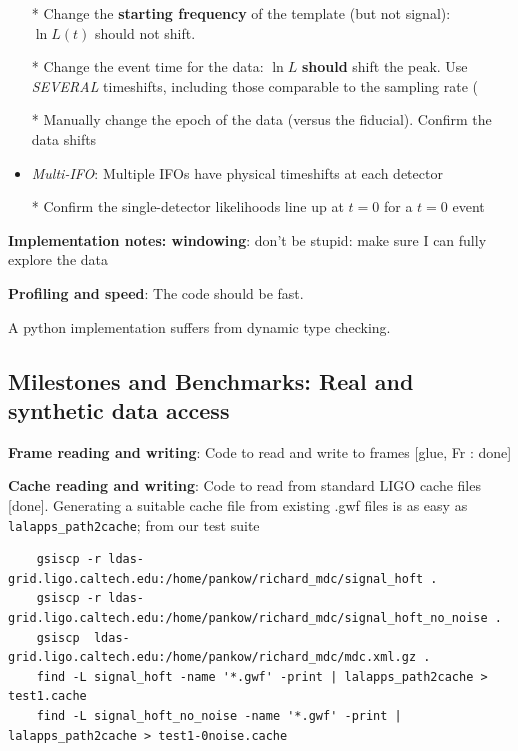 \documentclass[twocolumn,prd,nofootinbib]{revtex4}
\newcommand\editremark[1]{{\color{red} #1}}
\begin{document}
\begin{widetext}
\begin{itemize}
* Change the \textbf{starting frequency} of the template (but not signal): $\ln L(t)$ should not shift.  

* Change the event time for the data: $\ln L$ \textbf{should} shift the peak.  Use \emph{SEVERAL} timeshifts, including
those comparable to the sampling rate (

* Manually change the epoch of the data (versus the fiducial).  Confirm the data shifts

\item \emph{Multi-IFO}: Multiple IFOs have physical timeshifts at each detector

* Confirm the single-detector likelihoods line up at $t=0$ for a $t=0$ event

\end{itemize}


\noindent \textbf{Implementation notes: windowing}: \editremark{don't be stupid}: make sure I can fully explore the data

\noindent \textbf{Profiling and speed}: The code should be fast.

\begin{shaded}
A python implementation suffers from dynamic type checking.
\end{shaded}


\subsection{Milestones and Benchmarks: Real and synthetic data access}

\noindent \textbf{Frame reading and writing}: Code to read and write to frames [glue, Fr : done]

\noindent \textbf{Cache reading and writing}: Code to read from standard LIGO cache files [done].  Generating a suitable
cache file from existing .gwf files is as easy as \texttt{lalapps\_path2cache}; from our test suite
\begin{shaded}
\begin{verbatim}
	gsiscp -r ldas-grid.ligo.caltech.edu:/home/pankow/richard_mdc/signal_hoft .
	gsiscp -r ldas-grid.ligo.caltech.edu:/home/pankow/richard_mdc/signal_hoft_no_noise .
	gsiscp  ldas-grid.ligo.caltech.edu:/home/pankow/richard_mdc/mdc.xml.gz .
	find -L signal_hoft -name '*.gwf' -print | lalapps_path2cache > test1.cache
	find -L signal_hoft_no_noise -name '*.gwf' -print | lalapps_path2cache > test1-0noise.cache
\end{verbatim}
\end{shaded}




\end{widetext}
\end{document}
